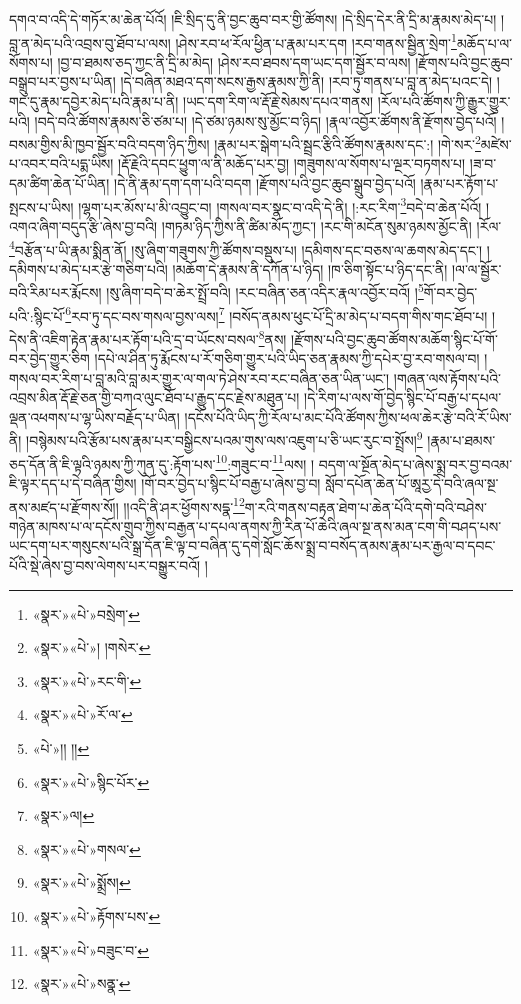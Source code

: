 དགའ་བ་འདི་དེ་གཏོར་མ་ཆེན་པོའོ། །ཇི་སྲིད་དུ་ནི་བྱང་ཆུབ་བར་གྱི་ཚོགས། །དེ་སྲིད་དེར་ནི་དྲི་མ་རྣམས་མེད་པ། །བླ་ན་མེད་པའི་འབྲས་བུ་ཐོབ་པ་ལས། །ཤེས་རབ་ཕ་རོལ་ཕྱིན་པ་རྣམ་པར་དག །རབ་གནས་སྦྱིན་སྲེག་\footnote{«སྣར་»«པེ་»བསྲེག་}མཆོད་པ་ལ་སོགས་པ། །བྱ་བ་ཐམས་ཅད་ཀྱང་ནི་དྲི་མ་མེད། །ཤེས་རབ་ཐབས་དག་ཡང་དག་སྦྱོར་བ་ལས། །རྫོགས་པའི་བྱང་ཆུབ་བསྒྲུབ་པར་བྱས་པ་ཡིན། །དེ་བཞིན་མཐའ་དག་སངས་རྒྱས་རྣམས་ཀྱི་ནི། །རབ་ཏུ་གནས་པ་བླ་ན་མེད་པའང་དེ། །གང་དུ་རྣམ་དབྱེར་མེད་པའི་རྣམ་པ་ནི། །ཡང་དག་རིག་ལ་རྡོ་རྗེ་སེམས་དཔའ་གནས། །རོལ་པའི་ཚོགས་ཀྱི་རྒྱུར་གྱུར་པའི། །བདེ་བའི་ཚོགས་རྣམས་ཅི་ཙམ་པ། །དེ་ཙམ་ཉམས་སུ་མྱོང་བ་ཉིད། །རྣལ་འབྱོར་ཚོགས་ནི་རྫོགས་བྱེད་པའོ། །བསམ་གྱིས་མི་ཁྱབ་སྦྱོར་བའི་བདག་ཉིད་ཀྱིས། །རྣམ་པར་སྒེག་པའི་སྦྲང་རྩིའི་ཚོགས་རྣམས་དང་:། །གེ་སར་\footnote{«སྣར་»«པེ་»། །གསེར་}མཛེས་པ་འབར་བའི་པདྨ་ཡིས། །རྡོ་རྗེའི་དབང་ཕྱུག་ལ་ནི་མཆོད་པར་བྱ། །གཟུགས་ལ་སོགས་པ་ལྔར་བཏགས་པ། །ཟ་བ་དམ་ཚིག་ཆེན་པོ་ཡིན། །དེ་ནི་རྣམ་དག་དག་པའི་བདག །རྫོགས་པའི་བྱང་ཆུབ་སྒྲུབ་བྱེད་པའོ། །རྣམ་པར་རྟོག་པ་སྤངས་པ་ཡིས། །ལྷག་པར་མོས་པ་མི་འབྱུང་བ། །གསལ་བར་སྣང་བ་འདི་དེ་ནི། །:རང་རིག་\footnote{«སྣར་»«པེ་»རང་གི་}བདེ་བ་ཆེན་པོའོ། །འགའ་ཞིག་བདུད་རྩི་ཞེས་བྱ་བའི། །གཏམ་ཉིད་ཀྱིས་ནི་ཚིམ་མོད་ཀྱང་། །རང་གི་མངོན་སུམ་ཉམས་མྱོང་ནི། །རོལ་\footnote{«སྣར་»«པེ་»རོ་ལ་}བརྩོན་པ་ཡི་རྣམ་སྨིན་ནོ། །སུ་ཞིག་གཟུགས་ཀྱི་ཚོགས་བསྡུས་པ། །དམིགས་དང་བཅས་ལ་ཆགས་མེད་དང་། །དམིགས་པ་མེད་པར་རྩེ་གཅིག་པའི། །མཆོག་དེ་རྣམས་ནི་དཀོན་པ་ཉིད། །ཁ་ཅིག་སྟོང་པ་ཉིད་དང་ནི། །ལ་ལ་སྦྱོར་བའི་རིམ་པར་རྨོངས། །སུ་ཞིག་བདེ་བ་ཆེར་སྤྲོ་བའི། །རང་བཞིན་ཅན་འདིར་རྣལ་འབྱོར་བའོ། །\footnote{«པེ་»།། །།}གོ་བར་བྱེད་པའི་:སྙིང་པོ་\footnote{«སྣར་»«པེ་»སྙིང་པོར་}རབ་ཏུ་དང་བས་གསལ་བྱས་ལས།\footnote{«སྣར་»ལ།} །བསོད་ནམས་ཕུང་པོ་དྲི་མ་མེད་པ་བདག་གིས་གང་ཐོབ་པ། །དེས་ནི་འཇིག་རྟེན་རྣམ་པར་རྟོག་པའི་དྲ་བ་ཡོངས་བསལ་\footnote{«སྣར་»«པེ་»གསལ་}ནས། །རྫོགས་པའི་བྱང་ཆུབ་ཚོགས་མཆོག་སྙིང་པོ་གོ་བར་བྱེད་གྱུར་ཅིག །དཔེ་ལ་ཤིན་ཏུ་རྨོངས་པ་རོ་གཅིག་གྱུར་པའི་ཡིད་ཅན་རྣམས་ཀྱི་དཔེར་བྱ་རབ་གསལ་བ། །གསལ་བར་རིག་པ་བླ་མའི་བླ་མར་གྱུར་ལ་གལ་ཏེ་ཤེས་རབ་རང་བཞིན་ཅན་ཡིན་ཡང་། །གཞན་ལས་རྟོགས་པའི་འབྲས་མིན་རྡོ་རྗེ་ཅན་གྱི་བཀའ་ལུང་ཐོབ་པ་རྒྱུད་དང་རྗེས་མཐུན་པ། །དེ་རིག་པ་ལས་གོ་བྱེད་སྙིང་པོ་བརྒྱ་པ་དཔལ་ལྡན་འཕགས་པ་ལྷ་ཡིས་བརྗོད་པ་ཡིན། །དངོས་པོའི་ཡིད་ཀྱི་རོལ་པ་མང་པོའི་ཚོགས་ཀྱིས་ཕལ་ཆེར་རྩེ་བའི་རོ་ཡིས་ནི། །བསྙེམས་པའི་རྩོམ་པས་རྣམ་པར་བསྒྱིངས་པའམ་གུས་ལས་འཇུག་པ་ཅི་ཡང་རུང་བ་སྤྲོས།\footnote{«སྣར་»«པེ་»སྨྲོས།} །རྣམ་པ་ཐམས་ཅད་དོན་ནི་ཇི་ལྟའི་ཉམས་ཀྱི་ཀུན་དུ་:རྟོག་པས་\footnote{«སྣར་»«པེ་»རྟོགས་པས་}:གཟུང་བ་\footnote{«སྣར་»«པེ་»བཟུང་བ་}ལས། །
བདག་ལ་སྔོན་མེད་པ་ཞེས་སྨྲ་བར་བྱ་བའམ་ཇི་ལྟར་དད་པ་དེ་བཞིན་གྱིས། །གོ་བར་བྱེད་པ་སྙིང་པོ་བརྒྱ་པ་ཞེས་བྱ་བ། སློབ་དཔོན་ཆེན་པོ་ཨཱརྱ་དེ་བའི་ཞལ་སྔ་ནས་མཛད་པ་རྫོགས་སོ།། །།འདི་ནི་ཤར་ཕྱོགས་སདྣ་\footnote{«སྣར་»«པེ་»སནྣ་}ག་རའི་གནས་བརྟན་ཐེག་པ་ཆེན་པོའི་དགེ་བའི་བཤེས་གཉེན་མཁས་པ་ལ་དངོས་གྲུབ་ཀྱིས་བརྒྱན་པ་དཔལ་ནགས་ཀྱི་རིན་པོ་ཆེའི་ཞལ་སྔ་ནས་མན་ངག་གི་བཤད་པས་ཡང་དག་པར་གསུངས་པའི་སྒྲ་དོན་ཇི་ལྟ་བ་བཞིན་དུ་དགེ་སློང་ཆོས་སྨྲ་བ་བསོད་ནམས་རྣམ་པར་རྒྱལ་བ་དབང་པོའི་སྡེ་ཞེས་བྱ་བས་ལེགས་པར་བསྒྱུར་བའོ། ། 